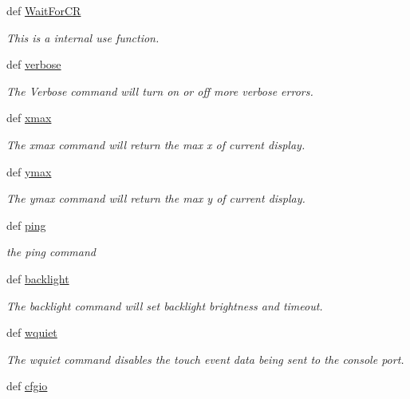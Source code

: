 \begin{DoxyCompactItemize}
\item 
def \hyperlink{namespacemodule_1_1ez_l_c_d3xx_a9c709d105cdc1e75f3b59214ba0f65d8}{Wait\-For\-C\-R}
\begin{DoxyCompactList}\small\item\em This is a internal use function. \end{DoxyCompactList}\item 
def \hyperlink{group___general_ga350c2e1be0d3d074d79d7a7278c44a22}{verbose}
\begin{DoxyCompactList}\small\item\em The Verbose command will turn on or off more verbose errors. \end{DoxyCompactList}\item 
def \hyperlink{group___general_ga594f839f4d44b15ece850c795ec8e7ba}{xmax}
\begin{DoxyCompactList}\small\item\em The xmax command will return the max x of current display. \end{DoxyCompactList}\item 
def \hyperlink{group___general_gae8e395513eeb5519612f3e988a059106}{ymax}
\begin{DoxyCompactList}\small\item\em The ymax command will return the max y of current display. \end{DoxyCompactList}\item 
def \hyperlink{group___general_ga123be6aba6fc316922b71e3fe1bc7aaf}{ping}
\begin{DoxyCompactList}\small\item\em the ping command \end{DoxyCompactList}\item 
def \hyperlink{group___general_ga8b73d9d966ac29c172e81aac05bf9bf9}{backlight}
\begin{DoxyCompactList}\small\item\em The backlight command will set backlight brightness and timeout. \end{DoxyCompactList}\item 
def \hyperlink{group___general_gae760b8839f85e30c2a294a593e77b9d7}{wquiet}
\begin{DoxyCompactList}\small\item\em The wquiet command disables the touch event data being sent to the console port. \end{DoxyCompactList}\item 
def \hyperlink{group___general_ga84837123679c1b262b8bb29108019dda}{cfgio}

\end{DoxyCompactItemize}
